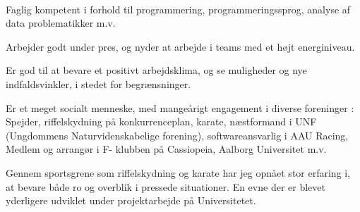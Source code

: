 \\
Faglig kompetent i forhold til programmering, programmeringssprog, analyse af data problematikker m.v.

Arbejder godt under pres, og nyder at arbejde i teams med et højt energiniveau. 

Er god til at bevare et positivt arbejdsklima, og se muligheder og nye indfaldsvinkler, i stedet for begrænsninger.

Er et meget socialt menneske, med mangeårigt engagement i diverse foreninger : Spejder, riffelskydning på konkurrenceplan, karate, næstformand i UNF (Ungdommens Naturvidenskabelige forening), softwareansvarlig i AAU Racing, Medlem og arrangør i F- klubben på Cassiopeia, Aalborg Universitet m.v.

Gennem sportsgrene som riffelskydning og karate har jeg opnået stor erfaring i, at bevare både ro og overblik i pressede situationer. En evne der er blevet yderligere udviklet under projektarbejde på Universitetet.
